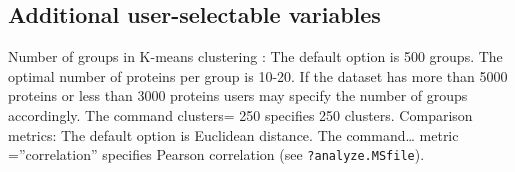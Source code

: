 \documentclass[a4paper]{article}
\numberwithin{equation}{subsection}
\begin{document}
\subsection{Additional user-selectable variables}
Number of groups in K-means clustering : The default option is 500 groups. The optimal number of proteins per group is 10-20. If the dataset has more than 5000 proteins or less than 3000 proteins users may specify the number of groups accordingly.  The command clusters= 250 specifies 250 clusters.
Comparison metrics: The default option is Euclidean distance. The
command… metric =”correlation” specifies Pearson correlation (see \texttt{?analyze.MSfile}).
\end{document}
